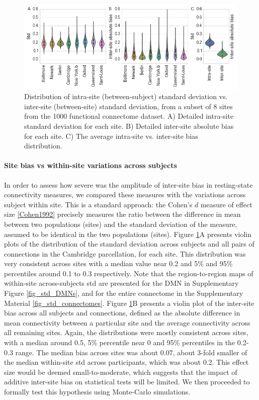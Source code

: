 \documentclass[authoryear]{elsarticle}
\begin{document}
\begin{figure}[tbp]
\begin{center}
\includegraphics[width=\linewidth]{../figures/boxplot_intra_inter_var.png}
\end{center}
\caption[inter vs. intra site variability]{
Distribution of intra-site (between-subject) standard deviation vs. inter-site (between-site) standard deviation, from a subset of 8 sites from the 1000 functional connectome dataset. A) Detailed intra-site standard deviation for each site. B) Detailed inter-site absolute bias for each site. C) The average intra-site vs. inter-site bias distribution. 
}
\label{fig_site_variability}
\end{figure}

\paragraph{Site bias vs within-site variations across subjects} In order to assess how severe was the amplitude of inter-site bias in resting-state connectivity measures, we compared these measures with the variations across subject within site. This is a standard approach: the Cohen's $d$ measure of effect size \ref{Cohen1992} precisely measures the ratio between the difference in mean between two populations (sites) and the standard deviation of the measure, assumed to be identical in the two populations (sites). Figure \ref{fig_site_variability}A presents violin plots of the distribution of the standard deviation across subjects and all pairs of connections in the Cambridge parcellation, for each site. This distribution was very consistent across sites with a median value near 0.2 and 5\% and 95\% percentiles around 0.1 to 0.3 respectively. Note that the region-to-region maps of within-site across-subjects std are presented for the DMN in Supplementary Figure \ref{fig_std_DMNs}, and for the entire connectome in the Supplementary Material \ref{fig_std_connectomes}. Figure \ref{fig_site_variability}B presents a violin plot of the inter-site bias across all subjects and connections, defined as the absolute difference in mean connectivity between a particular site and the average connectivity across all remaining sites. Again, the distributions were mostly consistent across sites, with a median around 0.5, 5\% percentile near 0 and 95\% percentiles in the 0.2-0.3 range. The median bias across sites was about 0.07, about 3-fold smaller of the median within-site std across participants, which was about 0.2. This effect size would be deemed small-to-moderate, which suggests that the impact of additive inter-site bias on statistical tests will be limited. We then proceeded to formally test this hypothesis using Monte-Carlo simulations. 
\end{document}
